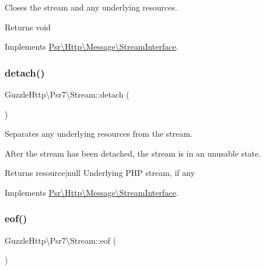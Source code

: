 Closes the stream and any underlying resources.

\begin{DoxyReturn}{Returns}
void 
\end{DoxyReturn}


Implements \hyperlink{interfacePsr_1_1Http_1_1Message_1_1StreamInterface_a0bbd0c821da0ee0c319f9867ff77c598}{Psr\textbackslash{}\+Http\textbackslash{}\+Message\textbackslash{}\+Stream\+Interface}.

\mbox{\label{classGuzzleHttp_1_1Psr7_1_1Stream_a4b82bb1cfca1d5e8939d9717779b870f}} 
\subsubsection{\texorpdfstring{detach()}{detach()}}
{\footnotesize\ttfamily Guzzle\+Http\textbackslash{}\+Psr7\textbackslash{}\+Stream\+::detach (\begin{DoxyParamCaption}{ }\end{DoxyParamCaption})}

Separates any underlying resources from the stream.

After the stream has been detached, the stream is in an unusable state.

\begin{DoxyReturn}{Returns}
resource$\vert$null Underlying P\+HP stream, if any 
\end{DoxyReturn}


Implements \hyperlink{interfacePsr_1_1Http_1_1Message_1_1StreamInterface_a1670dba880a8c14690746732960d4c9c}{Psr\textbackslash{}\+Http\textbackslash{}\+Message\textbackslash{}\+Stream\+Interface}.

\mbox{\label{classGuzzleHttp_1_1Psr7_1_1Stream_a3f44f4ac800bd92b0adc5539ac6ad64f}} 
\subsubsection{\texorpdfstring{eof()}{eof()}}
{\footnotesize\ttfamily Guzzle\+Http\textbackslash{}\+Psr7\textbackslash{}\+Stream\+::eof (\begin{DoxyParamCaption}{ }\end{DoxyParamCaption})}

